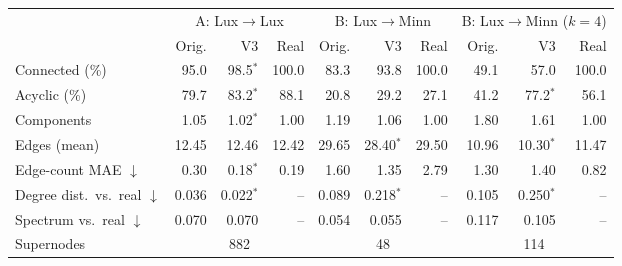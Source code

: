 \begin{tabular}{l rrr rrr rrr}
\toprule
 & \multicolumn{3}{c}{A: Lux$\to$Lux} & \multicolumn{3}{c}{B: Lux$\to$Minn} & \multicolumn{3}{c}{B: Lux$\to$Minn ($k{=}4$)} \\
\cmidrule(lr){2-4}\cmidrule(lr){5-7}\cmidrule(lr){8-10}
 & Orig. & V3 & Real & Orig. & V3 & Real & Orig. & V3 & Real \\
\midrule
Connected (\%) & 95.0 & 98.5$^\ast$ & 100.0 & 83.3 & 93.8 & 100.0 & 49.1 & 57.0 & 100.0 \\
Acyclic (\%) & 79.7 & 83.2$^\ast$ & 88.1 & 20.8 & 29.2 & 27.1 & 41.2 & 77.2$^\ast$ & 56.1 \\
Components & 1.05 & 1.02$^\ast$ & 1.00 & 1.19 & 1.06 & 1.00 & 1.80 & 1.61 & 1.00 \\
Edges (mean) & 12.45 & 12.46 & 12.42 & 29.65 & 28.40$^\ast$ & 29.50 & 10.96 & 10.30$^\ast$ & 11.47 \\
Edge-count MAE $\downarrow$ & 0.30 & 0.18$^\ast$ & 0.19 & 1.60 & 1.35 & 2.79 & 1.30 & 1.40 & 0.82 \\
Degree dist.\ vs.\ real $\downarrow$ & 0.036 & 0.022$^\ast$ & -- & 0.089 & 0.218$^\ast$ & -- & 0.105 & 0.250$^\ast$ & -- \\
Spectrum vs.\ real $\downarrow$ & 0.070 & 0.070 & -- & 0.054 & 0.055 & -- & 0.117 & 0.105 & -- \\
\midrule
Supernodes & \multicolumn{3}{c}{882} & \multicolumn{3}{c}{48} & \multicolumn{3}{c}{114} \\
\bottomrule
\end{tabular}
